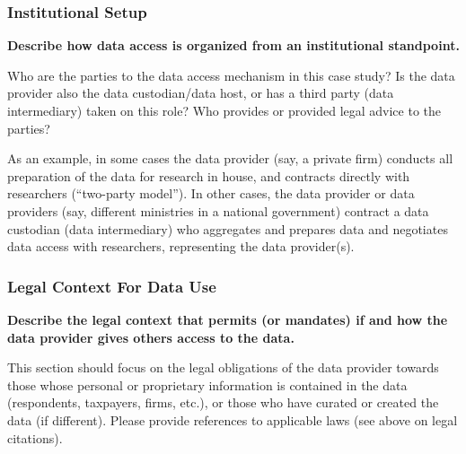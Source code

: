 \documentclass[
]{book}
\begin{document}
\hypertarget{institutional-setup-8}{%
\subsubsection*{Institutional Setup}\label{institutional-setup-8}}

\textbf{Describe how data access is organized from an institutional standpoint.}

Who are the parties to the data access mechanism in this case study? Is the data provider also the data custodian/data host, or has a third party (data intermediary) taken on this role? Who provides or provided legal advice to the parties?

As an example, in some cases the data provider (say, a private firm) conducts all preparation of the data for research in house, and contracts directly with researchers (``two-party model''). In other cases, the data provider or data providers (say, different ministries in a national government) contract a data custodian (data intermediary) who aggregates and prepares data and negotiates data access with researchers, representing the data provider(s).

\hypertarget{legal-context-for-data-use-8}{%
\subsubsection*{Legal Context For Data Use}\label{legal-context-for-data-use-8}}

\textbf{Describe the legal context that permits (or mandates) if and how the data provider gives others access to the data.}

This section should focus on the legal obligations of the data provider towards those whose personal or proprietary information is contained in the data (respondents, taxpayers, firms, etc.), or those who have curated or created the data (if different). Please provide references to applicable laws (see above on legal citations).
\end{document}
